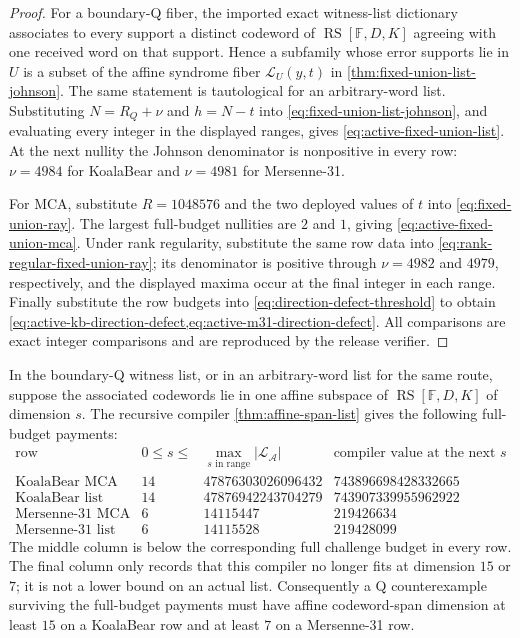 \documentclass[11pt,a4paper]{amsart}
\numberwithin{equation}{section}
\theoremstyle{remark}
\DeclareMathOperator{\RS}{RS}\DeclareMathOperator{\MCA}{MCA}\DeclareMathOperator{\CA}{CA}
\newcommand{\F}{\mathbb F}\newcommand{\B}{\mathbb B}\newcommand{\K}{\mathbb K}\newcommand{\Z}{\mathbb Z}
\begin{document}
\begin{proof}
For a boundary-Q fiber, the imported exact witness-list dictionary
\cite[Secs.~18--21]{CAP25v132} associates to every support a distinct
codeword of \(\RS[\F,D,K]\) agreeing with one received word on that
support.  Hence a subfamily whose error supports lie in \(U\) is a subset
of the affine syndrome fiber \(\mathcal L_U(y,t)\) in
\cref{thm:fixed-union-list-johnson}.  The same statement is tautological
for an arbitrary-word list.  Substituting \(N=R_Q+\nu\) and
\(h=N-t\) into \eqref{eq:fixed-union-list-johnson}, and evaluating every
integer in the displayed ranges, gives \eqref{eq:active-fixed-union-list}.
At the next nullity the Johnson denominator is nonpositive in every row:
\(\nu=4984\) for KoalaBear and \(\nu=4981\) for Mersenne-31.

For MCA, substitute \(R=1048576\) and the two deployed values of \(t\)
into \eqref{eq:fixed-union-ray}.  The largest full-budget nullities are
\(2\) and \(1\), giving \eqref{eq:active-fixed-union-mca}.  Under rank
regularity, substitute the same row data into
\eqref{eq:rank-regular-fixed-union-ray}; its denominator is positive
through \(\nu=4982\) and \(4979\), respectively, and the displayed maxima
occur at the final integer in each range.  Finally substitute the row
budgets into \eqref{eq:direction-defect-threshold} to obtain
\cref{eq:active-kb-direction-defect,eq:active-m31-direction-defect}.
All comparisons are exact integer comparisons and are reproduced by the
release verifier.
\end{proof}

\begin{proposition}
\label{prop:active-affine-span-payments}
In the boundary-Q witness list, or in an arbitrary-word list for the same
route, suppose the associated codewords lie in one affine subspace of
\(\RS[\F,D,K]\) of dimension \(s\).  The recursive compiler
\cref{thm:affine-span-list} gives the following full-budget payments:
\[
\begin{array}{c|r|r|r}
\text{row}&0\le s\le&
 \max\limits_{s\text{ in range}}|\mathcal L_{\mathcal A}|&
 \text{compiler value at the next }s\\ \hline
\text{KoalaBear MCA}&14&47876303026096432&743896698428332665\\
\text{KoalaBear list}&14&47876942243704279&743907339955962922\\
\text{Mersenne-31 MCA}&6&14115447&219426634\\
\text{Mersenne-31 list}&6&14115528&219428099
\end{array}
\tag{AF-Q/list}\label{eq:active-affine-span-list}
\]
The middle column is below the corresponding full challenge budget in
every row.  The final column only records that this compiler no longer
fits at dimension \(15\) or \(7\); it is not a lower bound on an actual
list.  Consequently a Q counterexample surviving the full-budget payments
must have affine codeword-span dimension at least \(15\) on a KoalaBear
row and at least \(7\) on a Mersenne-31 row.
\end{proposition}
\end{document}
